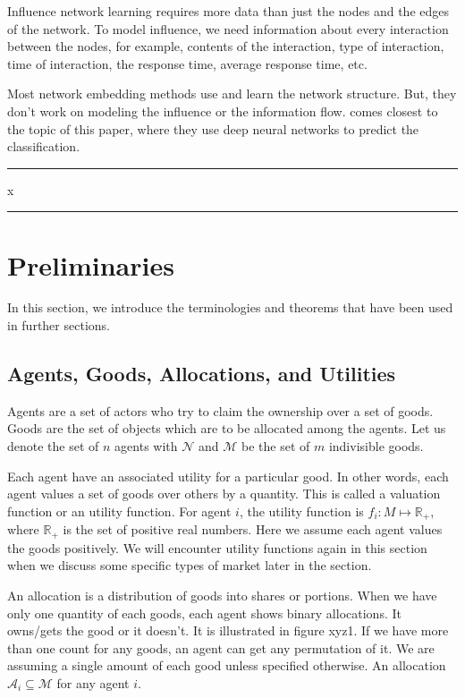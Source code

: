 Influence network learning requires more data than just the nodes and the edges of the network. To model influence, we need information about every interaction between the nodes, for example, contents of the interaction, type of interaction, time of interaction, the response time, average response time, etc.

Most network embedding methods use and learn the network structure. But, they don't work on modeling the influence or the information flow. \cite{qiu2018deepinf} comes closest to the topic of this paper, where they use deep neural networks to predict the classification.

\hrule
x
\hrule

\section{Preliminaries}
\label{section_prelim}
In this section, we introduce the terminologies and theorems that have been used in further sections.

\subsection{Agents, Goods, Allocations, and Utilities}
Agents are a set of actors who try to claim the ownership over a set of goods. Goods are the set of objects which are to be allocated among the agents. Let us denote the set of $\mathit{n}$ agents with $\mathcal{N}$ and $\mathcal{M}$ be the set of $\mathit{m}$ indivisible goods.

Each agent have an associated utility for a particular good. In other words, each agent values a set of goods over others by a quantity. This is called a valuation function or an utility function. For agent $i$, the utility function is $f_i: M\mapsto \mathbb{R_+}$, where $\mathbb{R_+}$ is the set of positive real numbers. Here we assume each agent values the goods positively. We will encounter utility functions again in this section when we discuss some specific types of market later in the section.

An allocation is a distribution of goods into shares or portions. When we have only one quantity of each goods, each agent shows binary allocations. It owns/gets the good or it doesn't. It is illustrated in figure xyz1. If we have more than one count for any goods, an agent can get any permutation of it. We are assuming a single amount of each good unless specified otherwise. An allocation $\mathcal{A}_i\subseteq \mathcal{M}$ for any agent $i$.

